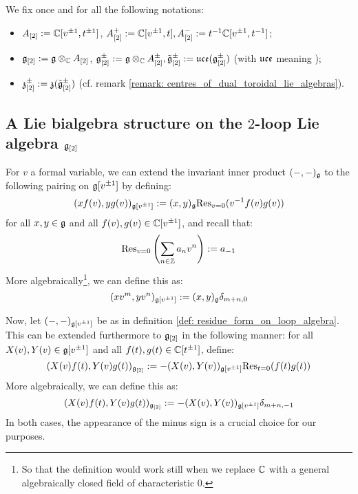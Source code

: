     \begin{convention} \label{conv: multiloop_algebras}
        We fix once and for all the following notations:
        \begin{itemize}
            \item $A_{[2]} := \mathbb{C}[v^{\pm 1}, t^{\pm 1}]$, $A_{[2]}^+ := \mathbb{C}[v^{\pm 1}, t], A_{[2]}^- := t^{-1}\mathbb{C}[v^{\pm 1}, t^{-1}]$;
            \item $\g_{[2]} := \g \tensor_{\bbC} A_{[2]}$, $\g_{[2]}^{\pm} := \g \tensor_{\bbC} A_{[2]}^{\pm}, \tilde{\g}_{[2]}^{\pm} := \uce(\g_{[2]}^{\pm})$ (with $\mathfrak{uce}$ meaning );
            \item $\mathfrak{z}_{[2]}^{\pm} := \mathfrak{z}(\tilde{\mathfrak{g}}_{[2]}^{\pm})$ (cf. remark \ref{remark: centres_of_dual_toroidal_lie_algebras}).
        \end{itemize}
    \end{convention}

    \subsection{A Lie bialgebra structure on the \texorpdfstring{$2$}{}-loop Lie algebra \texorpdfstring{$\mathfrak{g}_{[2]}$}{}}
        \begin{definition} \label{def: residue_form_on_loop_algebra}
            For $v$ a formal variable, we can extend the invariant inner product $(-, -)_{\mathfrak{g}}$ to the following pairing on $\mathfrak{g}[v^{\pm 1}]$ by defining:
                $$(x f(v), y g(v))_{\mathfrak{g}[v^{\pm 1}]} := (x, y)_{\mathfrak{g}} \mathrm{Res}_{v = 0}( v^{-1} f(v) g(v) )$$
            for all $x, y \in \mathfrak{g}$ and all $f(v), g(v) \in \mathbb{C}[v^{\pm 1}]$, and recall that:
                $$\mathrm{Res}_{v = 0}\left( \sum_{n \in \mathbb{Z}} a_n v^n \right) := a_{-1}$$
            More algebraically\footnote{So that the definition would work still when we replace $\mathbb{C}$ with a general algebraically closed field of characteristic $0$.}, we can define this as:
                $$(x v^m, y v^n)_{\mathfrak{g}[v^{\pm 1}]} := (x, y)_{\mathfrak{g}} \delta_{m + n, 0}$$
        \end{definition}
        \begin{definition} \label{def: residue_form_on_multiloop_algebra}
            Now, let $(-, -)_{\mathfrak{g}[v^{\pm 1}]}$ be as in definition \ref{def: residue_form_on_loop_algebra}. This can be extended furthermore to $\mathfrak{g}_{[2]}$ in the following manner: for all $X(v), Y(v) \in \mathfrak{g}[v^{\pm 1}]$ and all $f(t), g(t) \in \mathbb{C}[t^{\pm 1}]$, define:
                $$(X(v) f(t), Y(v) g(t))_{\mathfrak{g}_{[2]}} := -(X(v), Y(v))_{\mathfrak{g}[v^{\pm 1}]} \mathrm{Res}_{t = 0}( f(t) g(t) )$$
            More algebraically, we can define this as:
                $$(X(v) f(t), Y(v) g(t))_{\mathfrak{g}_{[2]}} := -(X(v), Y(v))_{\mathfrak{g}[v^{\pm 1}]} \delta_{m + n, -1}$$
            In both cases, the appearance of the minus sign is a crucial choice for our purposes. 
        \end{definition}

